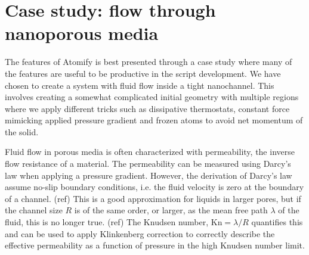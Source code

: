\documentclass[aps,pre,twocolumn,letterpaper,floatfix,nofootinbib]{revtex4}
\begin{document}
\section{\label{sec:casestudy}Case study: flow through nanoporous media}
The features of Atomify is best presented through a case study where many of the features are useful to be productive in the script development.
We have chosen to create a system with fluid flow inside a tight nanochannel.
This involves creating a somewhat complicated initial geometry with multiple regions where we apply different tricks such as dissipative thermostats, constant force mimicking applied pressure gradient and frozen atoms to avoid net momentum of the solid.

Fluid flow in porous media is often characterized with permeability, the inverse flow resistance of a material.
The permeability can be measured using Darcy's law when applying a pressure gradient.
However, the derivation of Darcy's law assume no-slip boundary conditions, i.e. the fluid velocity is zero at the boundary of a channel. (ref)
This is a good approximation for liquids in larger pores, but if the channel size $R$ is of the same order, or larger, as the mean free path $\lambda$ of the fluid, this is no longer true. (ref)
The Knudsen number, $\text{Kn} = \lambda / R$ quantifies this and can be used to apply Klinkenberg correction\citep{klinkenberg1941permeability} to correctly describe the effective permeability as a function of pressure in the high Knudsen number limit.
\end{document}
